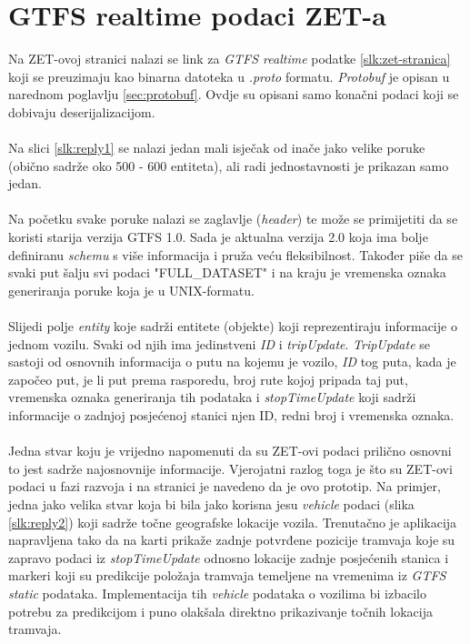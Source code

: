 \documentclass[zavrsnirad]{fer}
\begin{document}
\section{GTFS realtime podaci ZET-a}
Na ZET-ovoj stranici nalazi se link za \textit{GTFS realtime} podatke \ref{slk:zet-stranica} koji se preuzimaju kao binarna datoteka u \textit{.proto} formatu. \textit{Protobuf} je opisan u narednom poglavlju \ref{sec:protobuf}. Ovdje su opisani samo konačni podaci koji se dobivaju deserijalizacijom.\\\\
Na slici \ref{slk:reply1} se nalazi jedan mali isječak od inače jako velike poruke (obično sadrže oko 500 - 600 entiteta), ali radi jednostavnosti je prikazan samo jedan.\\\\
Na početku svake poruke nalazi se zaglavlje (\textit{header}) te može se primijetiti da se koristi starija verzija GTFS 1.0. Sada je aktualna verzija 2.0 koja ima bolje definiranu \textit{schemu} s više informacija i pruža veću fleksibilnost. Također piše da se svaki put šalju svi podaci "FULL\_DATASET" i na kraju je vremenska oznaka generiranja poruke koja je u UNIX-formatu.\\\\
Slijedi polje \textit{entity} koje sadrži entitete (objekte) koji reprezentiraju informacije o jednom vozilu. Svaki od njih ima jedinstveni \textit{ID} i \textit{tripUpdate}. \textit{TripUpdate} se sastoji od osnovnih informacija o putu na kojemu je vozilo, \textit{ID} tog puta, kada je započeo put, je li put prema rasporedu, broj rute kojoj pripada taj put, vremenska oznaka generiranja tih podataka i \textit{stopTimeUpdate} koji sadrži informacije o zadnjoj posjećenoj stanici njen ID, redni broj i vremenska oznaka.\\\\
Jedna stvar koju je vrijedno napomenuti da su ZET-ovi podaci prilično osnovni to jest sadrže najosnovnije informacije. Vjerojatni razlog toga je što su ZET-ovi podaci u fazi razvoja i na stranici je navedeno da je ovo prototip. Na primjer, jedna jako velika stvar koja bi bila jako korisna jesu \textit{vehicle} podaci (slika \ref{slk:reply2}) koji sadrže točne geografske lokacije vozila. Trenutačno je aplikacija napravljena tako da na karti prikaže zadnje potvrđene pozicije tramvaja koje su zapravo podaci iz \textit{stopTimeUpdate} odnosno lokacije zadnje posjećenih stanica i markeri koji su predikcije položaja tramvaja temeljene na vremenima iz \textit{GTFS static} podataka. Implementacija tih \textit{vehicle} podataka o vozilima bi izbacilo potrebu za predikcijom i puno olakšala direktno prikazivanje točnih lokacija tramvaja.
\end{document}
